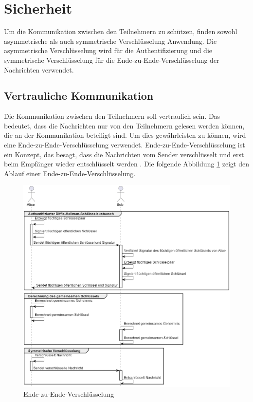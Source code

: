 \section{Sicherheit}
\label{subsec:sicherheit}

Um die Kommunikation zwischen den Teilnehmern zu schützen, finden sowohl asymmetrische als auch symmetrische Verschlüsselung Anwendung. Die asymmetrische Verschlüsselung wird für die Authentifizierung und die symmetrische Verschlüsselung für die Ende-zu-Ende-Verschlüsselung der Nachrichten verwendet. 

\subsection{Vertrauliche Kommunikation}
\label{subsec:vertrauliche_kommunikation}

Die Kommunikation zwischen den Teilnehmern soll vertraulich sein. Das bedeutet, dass die Nachrichten nur von den Teilnehmern gelesen werden können, die an der Kommunikation beteiligt sind. Um dies gewährleisten zu können, wird eine Ende-zu-Ende-Verschlüsselung verwendet. Ende-zu-Ende-Verschlüsselung ist ein Konzept, das besagt, dass die Nachrichten vom Sender verschlüsselt und erst beim Empfänger wieder entschlüsselt werden \parencite[S. 233-260]{Wong_KryptoPraxis}. Die folgende Abbildung \ref{fig:ende_zu_ende} zeigt den Ablauf einer Ende-zu-Ende-Verschlüsselung.


\begin{figure}[H]
    \centering
    \includegraphics[width=1\linewidth]{images/end2end.png}
    \caption{Ende-zu-Ende-Verschlüsselung}
    \label{fig:ende_zu_ende}
\end{figure}

